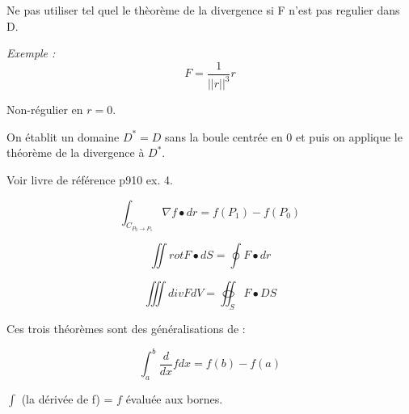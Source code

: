 \begin{myrem}
Ne pas utiliser tel quel le thèorème de la divergence si F n'est pas regulier dans D.


\emph{Exemple :} \[F = \dfrac{1}{||r||^3} r \]

Non-régulier en $r=0$.

On établit un domaine $ D^* =D $ sans la boule centrée en 0 et puis on applique le théorème de la divergence à $D^*$.

Voir livre de référence p910 ex. 4.
\end{myrem}

\begin{myrem}
\[\int_{C_{P_0 \to P_1}} \nabla f \bullet dr = f(P_1) - f(P_0) \]

\[\iint rot F \bullet dS = \oint F \bullet dr \]

\[\iiint div F dV = \oiint_S F \bullet DS\]

Ces trois théorèmes sont des généralisations de :


\[\int_a^b \frac{d}{dx}f dx = f(b) - f(a) \]

$\int$ (la dérivée de f) = $f$ évaluée aux bornes.
\end{myrem}
